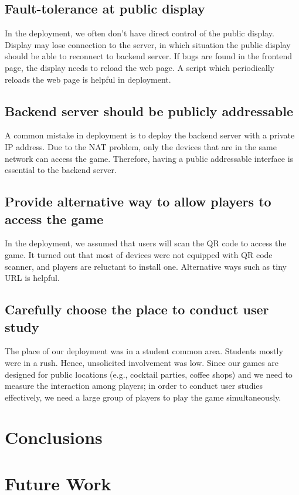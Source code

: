 \documentclass{sig-alternate}
\begin{document}
\subsection{Fault-tolerance at public display}
In the deployment, we often don't have
direct control of the public display. Display may lose connection to
the server, in which situation the public display should be able to reconnect to 
backend server. If bugs are found in the frontend page, the display needs to 
reload the web page. A script which periodically reloads the web page is helpful 
in deployment.

\subsection{Backend server should be publicly addressable}
A common mistake in 
deployment is to deploy the backend server with a private IP address. Due to 
the NAT problem, only the devices that are in the same network can access the 
game. Therefore, having a public addressable interface is essential to the backend server.

\subsection{Provide alternative way to allow players to access the game}
In the deployment, we assumed 
that users will scan the QR code to access the game. It turned out that most of devices 
were not equipped with QR code scanner, and players are reluctant to install one. 
Alternative ways such as tiny URL is helpful. 

\subsection{Carefully choose the place to conduct user study}
The place of our deployment was in 
a student common area. Students mostly were in a rush. Hence, unsolicited involvement 
was low. Since our games are designed for public locations (e.g., cocktail parties, coffee shops) and we need to measure the interaction among players; in order to conduct user studies effectively, we need a large group of players to play the game simultaneously.

\section{Conclusions}


\section{Future Work}




\end{document}
